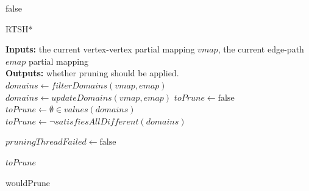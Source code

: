 \begin{Algorithm}[t]{18cm}
{ }
 \Return false\;
 \caption{RTSH*}
 \label{algorithm:ndSHD2-ext}
\end{Algorithm}


\begin{algorithm}
\DontPrintSemicolon
\SetAlgoLined
\LinesNumbered
\textbf{Inputs: } the current vertex-vertex partial mapping $\mathit{vmap}$, the current edge-path $\mathit{emap}$ partial mapping\\
\textbf{Outputs: } whether pruning should be applied.\\

 {
	$\mathit{domains} \longleftarrow \mathit{filterDomains}(\mathit{vmap}, \mathit{emap})$\;
}  {
	$\mathit{domains} \longleftarrow \mathit{updateDomains}(\mathit{vmap}, \mathit{emap})$\;
} 
$\mathit{toPrune} \longleftarrow \text{false}$\;
 {
	$\mathit{toPrune} \longleftarrow \emptyset \in \mathit{values}(\mathit{domains})$\hspace{6cm}\;
}  {
	$\mathit{toPrune} \longleftarrow \lnot \mathit{satisfiesAllDifferent}(\mathit{domains})$\hspace{4.2cm}\;
}

 {
	$\mathit{pruningThreadFailed} \longleftarrow \text{false}$\;
}

\color{black}
\Return $\mathit{toPrune}$\;
 \caption{wouldPrune}
 \label{algorithm:wouldPrune-ext}
\end{algorithm}


